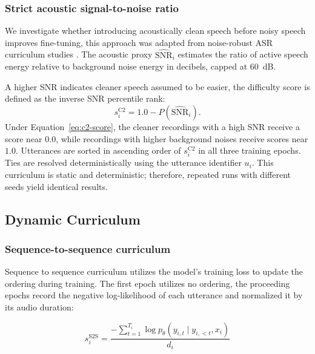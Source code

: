 {\subsubsection{Strict acoustic signal-to-noise ratio}

We investigate whether introducing acoustically clean speech before
noisy speech improves fine-tuning, this approach was adapted from noise-robust ASR
curriculum studies \citep{Braun2017}. The acoustic proxy $\widehat{\text{SNR}}_i$ estimates the 
ratio of active speech energy relative to background noise energy in decibels, capped at 60~dB.

A higher SNR indicates cleaner speech assumed to be easier, the difficulty
score is defined as the inverse SNR percentile rank:
\begin{equation}
    s_i^{\text{C2}} = 1.0 - P(\widehat{\text{SNR}}_i).
    \label{eq:c2-score}
\end{equation}
Under Equation~\eqref{eq:c2-score}, the cleaner recordings with a high SNR receive
a score near $0.0$, while recordings with higher background noises receive scores near
$1.0$. Utterances are sorted in ascending order of $s_i^{\text{C2}}$ in all three 
training epochs. Ties are resolved deterministically using the utterance identifier $u_i$. This curriculum is static and deterministic; therefore, repeated runs with different seeds yield identical results.

\subsection{Dynamic Curriculum}

\subsubsection{Sequence-to-sequence curriculum}

Sequence to sequence curriculum utilizes the model's training loss to update the ordering during training. The first epoch utilizes no ordering, the proceeding epochs record the negative log-likelihood of each utterance and normalized it by its audio duration:

\begin{equation}
    s_i^{\text{S2S}} = \frac{-\sum_{t=1}^{T_i} \log p_\theta(y_{i,t} \mid y_{i,<t}, x_i)}{d_i}
\end{equation}

}
